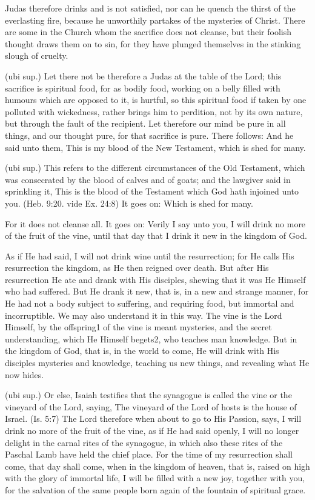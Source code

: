  Judas therefore drinks and is not satisfied, nor can he quench the thirst of the everlasting fire, because he unworthily partakes of the mysteries of Christ. There are some in the Church whom the sacrifice does not cleanse, but their foolish thought draws them on to sin, for they have plunged themselves in the stinking slough of cruelty.

 (ubi sup.) Let there not be therefore a Judas at the table of the Lord; this sacrifice is spiritual food, for as bodily food, working on a belly filled with humours which are opposed to it, is hurtful, so this spiritual food if taken by one polluted with wickedness, rather brings him to perdition, not by its own nature, but through the fault of the recipient. Let therefore our mind be pure in all things, and our thought pure, for that sacrifice is pure. There follows: And he said unto them, This is my blood of the New Testament, which is shed for many.

 (ubi sup.) This refers to the different circumstances of the Old Testament, which was consecrated by the blood of calves and of goats; and the lawgiver said in sprinkling it, This is the blood of the Testament which God hath injoined unto you. (Heb. 9:20. vide Ex. 24:8) It goes on: Which is shed for many.

 For it does not cleanse all. It goes on: Verily I say unto you, I will drink no more of the fruit of the vine, until that day that I drink it new in the kingdom of God.

 As if He had said, I will not drink wine until the resurrection; for He calls His resurrection the kingdom, as He then reigned over death. But after His resurrection He ate and drank with His disciples, shewing that it was He Himself who had suffered. But He drank it new, that is, in a new and strange manner, for He had not a body subject to suffering, and requiring food, but immortal and incorruptible. We may also understand it in this way. The vine is the Lord Himself, by the offspring1 of the vine is meant mysteries, and the secret understanding, which He Himself begets2, who teaches man knowledge. But in the kingdom of God, that is, in the world to come, He will drink with His disciples mysteries and knowledge, teaching us new things, and revealing what He now hides.

 (ubi sup.) Or else, Isaiah testifies that the synagogue is called the vine or the vineyard of the Lord, saying, The vineyard of the Lord of hosts is the house of Israel. (Is. 5:7) The Lord therefore when about to go to His Passion, says, I will drink no more of the fruit of the vine, as if He had said openly, I will no longer delight in the carnal rites of the synagogue, in which also these rites of the Paschal Lamb have held the chief place. For the time of my resurrection shall come, that day shall come, when in the kingdom of heaven, that is, raised on high with the glory of immortal life, I will be filled with a new joy, together with you, for the salvation of the same people born again of the fountain of spiritual grace.

